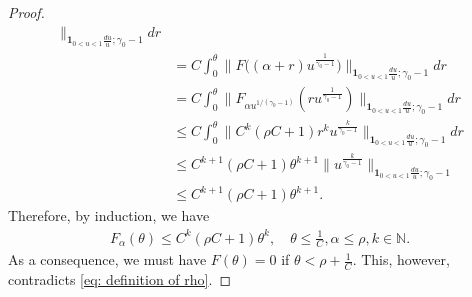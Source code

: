 \documentclass[UTF8]{pkuthss}
\theoremstyle{plain}
\theoremstyle{definition}
\numberwithin{equation}{section}
\begin{document}
\begin{proof}
\begin{align}
	\|_{\mathbf 1_{0<u<1}\frac{du}{u}; \gamma_0 - 1} dr\\
   &=  C\int_0^\theta \big \|F\big( (\alpha + r)u^{\frac{1}{\gamma_0 - 1}} \big )
	\big \|_{\mathbf 1_{0<u<1}\frac{du}{u}; \gamma_0 - 1} dr
	\\& =  C\int_0^\theta \|F_{\alpha u^{1/(\gamma_0 - 1)}}( ru^{\frac{1}{\gamma_0 - 1}}) \|_{\mathbf 1_{0<u<1}\frac{du}{u}; \gamma_0 - 1} dr
  \\&\leq C\int_0^ \theta \|C^k (\rho C+ 1) r^k u^{\frac{k}{\gamma_0 - 1} }
	\|_{\mathbf 1_{0<u<1}\frac{du}{u}; \gamma_0 - 1} dr
	\\&\leq C^{k+1} (\rho C + 1) \theta^{k+1} \|u^{\frac{k}{\gamma_0 - 1} } \|_{\mathbf 1_{0<u<1}\frac{du}{u}; \gamma_0 - 1}
\\&\leq C^{k+1} (\rho C+1) \theta^{k+1} .
\end{align}
	Therefore, by induction, we have
\begin{align}
	F_\alpha (\theta)
	\leq C^k(\rho C + 1) \theta^k,
	\quad \theta \leq \frac{1}{C}, \alpha \leq \rho, k \in \mathbb N.
\end{align}
	As a consequence, we must have $F(\theta) = 0$ if $\theta < \rho + \frac{1}{C}$.
	This, however, contradicts \eqref{eq: definition of rho}.
\end{proof}
\end{document}

